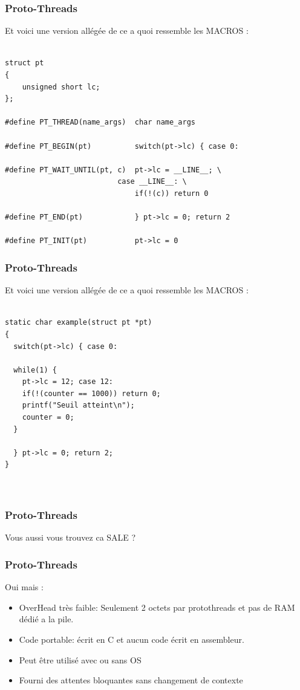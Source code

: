 \documentclass{smilebeamer}
\begin{document}
\begin{frame}[containsverbatim]

\frametitle{Proto-Threads}

Et voici une version allégée de ce a quoi ressemble les MACROS :
  \begin{verbatim}

struct pt
{
    unsigned short lc;
};

#define PT_THREAD(name_args)  char name_args

#define PT_BEGIN(pt)          switch(pt->lc) { case 0:

#define PT_WAIT_UNTIL(pt, c)  pt->lc = __LINE__; \
	                      case __LINE__: \
                              if(!(c)) return 0
                              
#define PT_END(pt)            } pt->lc = 0; return 2

#define PT_INIT(pt)           pt->lc = 0

  \end{verbatim}
\end{frame}

\begin{frame}[containsverbatim]
\frametitle{Proto-Threads}

Et voici une version allégée de ce a quoi ressemble les MACROS :
  \begin{verbatim}

static char example(struct pt *pt)
{
  switch(pt->lc) { case 0:

  while(1) {
    pt->lc = 12; case 12:
    if(!(counter == 1000)) return 0;
    printf("Seuil atteint\n");
    counter = 0;
  }

  } pt->lc = 0; return 2;
}



  \end{verbatim}
\end{frame}

\begin{frame}[containsverbatim]
\frametitle{Proto-Threads}

Vous aussi vous trouvez ca SALE ?

\end{frame}


\begin{frame}[containsverbatim]
\frametitle{Proto-Threads}

Oui mais :
\begin{itemize}

\item OverHead très faible: Seulement 2 octets par protothreads et pas de RAM dédié a la pile.
\item Code portable: écrit en C et aucun code écrit en assembleur.
\item Peut être utilisé avec ou sans OS
\item Fourni des attentes bloquantes sans changement de contexte
\end{itemize}
\end{frame}
\end{document}
